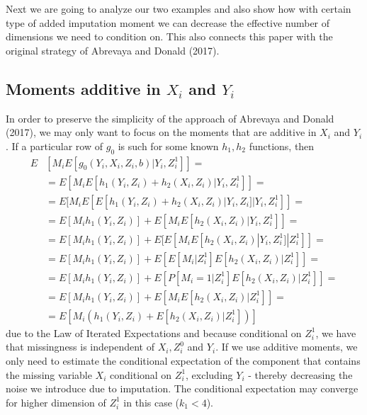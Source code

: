\documentclass{article}
\theoremstyle{definition}
\theoremstyle{remark}
\begin{document}
Next we are going to analyze our two examples and also show how with certain type of added imputation moment we can decrease the effective number of dimensions we need to condition on. This also connects this paper with the original strategy of Abrevaya and Donald (2017).

\subsection{Moments additive in $X_i$ and $Y_i$}
In order to preserve the simplicity of the approach of Abrevaya and Donald (2017), we  may only want to focus on the moments that are additive in $X_i$ and $Y_i$. If a particular row of $g_0$ is such for some known $h_1,h_2$ functions, then
\begin{align}
E&[M_i E[g_0(Y_i,X_i,Z_i,b)|Y_i,Z_i^1]]= \\
&= E[M_iE[h_1(Y_i,Z_i)+h_2(X_i,Z_i)|Y_i,Z_i^1]]= \nonumber \\
&= E[M_iE[E[h_1(Y_i,Z_i)+h_2(X_i,Z_i)|Y_i,Z_i]|Y_i,Z_i^1]]= \nonumber \\
&= E[M_i h_1(Y_i,Z_i)] +E[M_i E[h_2(X_i,Z_i)|Y_i, Z_i^1]]= \nonumber \\
&=E[M_i h_1(Y_i,Z_i)] +E[E[M_i E[h_2(X_i,Z_i)|Y_i, Z_i^1]|Z_i^1]]= \nonumber \\
&=E[M_i h_1(Y_i,Z_i)] +E[E[M_i|Z_i^1] E[h_2(X_i,Z_i)|Z_i^1]]= \nonumber \\
&=E[M_i h_1(Y_i,Z_i)] +E[P[M_i=1|Z_i^1]E[h_2(X_i,Z_i)|Z_i^1]]= \nonumber \\
&= E[M_i h_1(Y_i,Z_i)] +E[M_i E[h_2(X_i,Z_i)|Z^1_i]]= \nonumber \\
&= E\left[M_i (h_1(Y_i,Z_i) + E[h_2(X_i,Z_i)|Z^1_i])\right] \nonumber
\end{align}
due to the Law of Iterated Expectations and because conditional on $Z_i^1$, we have that missingness is independent of $X_i,Z_i^0$ and $Y_i$. If we use additive moments, we only need to estimate the conditional expectation of the component that contains the missing variable $X_i$ conditional on $Z_i^1$, excluding $Y_i$ - thereby decreasing the noise we introduce due to imputation. The conditional expectation may converge for higher dimension of $Z_i^1$ in this case ($k_1<4$).
\end{document}
